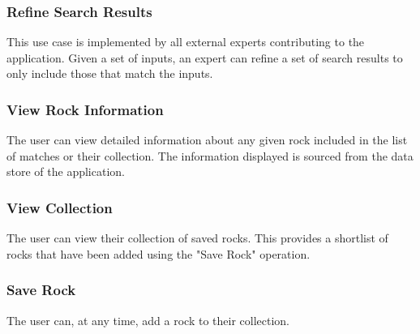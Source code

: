 \documentclass[titlepage]{article}
\begin{document}
  \subsubsection{Refine Search Results}
    This use case is implemented by all external experts contributing to the application. Given a set of inputs, an expert can refine a set of search results to only include those that match the inputs.
  \subsubsection{View Rock Information}
    The user can view detailed information about any given rock included in the list of matches or their collection. The information displayed is sourced from the data store of the application.
  \subsubsection{View Collection}
    The user can view their collection of saved rocks. This provides a shortlist of rocks that have been added using the "Save Rock" operation. 
  \subsubsection{Save Rock}
    The user can, at any time, add a rock to their collection.
\end{document}
